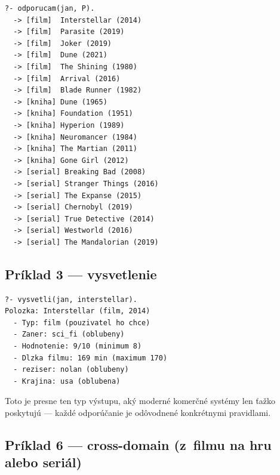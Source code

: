 \documentclass[11pt,a4paper]{article}
\begin{document}
\begin{lstlisting}[numbers=none]
?- odporucam(jan, P).
  -> [film]  Interstellar (2014)
  -> [film]  Parasite (2019)
  -> [film]  Joker (2019)
  -> [film]  Dune (2021)
  -> [film]  The Shining (1980)
  -> [film]  Arrival (2016)
  -> [film]  Blade Runner (1982)
  -> [kniha] Dune (1965)
  -> [kniha] Foundation (1951)
  -> [kniha] Hyperion (1989)
  -> [kniha] Neuromancer (1984)
  -> [kniha] The Martian (2011)
  -> [kniha] Gone Girl (2012)
  -> [serial] Breaking Bad (2008)
  -> [serial] Stranger Things (2016)
  -> [serial] The Expanse (2015)
  -> [serial] Chernobyl (2019)
  -> [serial] True Detective (2014)
  -> [serial] Westworld (2016)
  -> [serial] The Mandalorian (2019)
\end{lstlisting}

\subsection{Príklad 3 --- vysvetlenie}

\begin{lstlisting}[numbers=none]
?- vysvetli(jan, interstellar).
Polozka: Interstellar (film, 2014)
  - Typ: film (pouzivatel ho chce)
  - Zaner: sci_fi (oblubeny)
  - Hodnotenie: 9/10 (minimum 8)
  - Dlzka filmu: 169 min (maximum 170)
  - reziser: nolan (oblubeny)
  - Krajina: usa (oblubena)
\end{lstlisting}

Toto je presne ten typ výstupu, aký moderné komerčné systémy
len ťažko poskytujú --- každé odporúčanie je odôvodnené
konkrétnymi pravidlami.

\subsection{Príklad 6 --- cross-domain (z~filmu na hru alebo seriál)}
\end{document}
